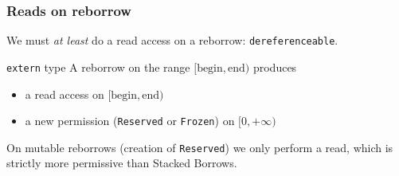 \begin{frame}
    \frametitle{Reads on reborrow}
    We must \textit{at least} do a read access on a reborrow: \texttt{dereferenceable}.\\

    \begin{block}{\texttt{extern} type}
        A reborrow on the range \([\text{begin}, \text{end})\) produces
        \begin{itemize}
            \item a read access on \([\text{begin}, \text{end})\)
            \item a new permission (\texttt{Reserved} or \texttt{Frozen}) on \([0, +\infty)\)
        \end{itemize}
    \end{block}

     \begin{block}{}
        On mutable reborrows (creation of \texttt{Reserved}) we only perform a read,
        which is strictly more permissive than Stacked Borrows.
    \end{block}
\end{frame}



